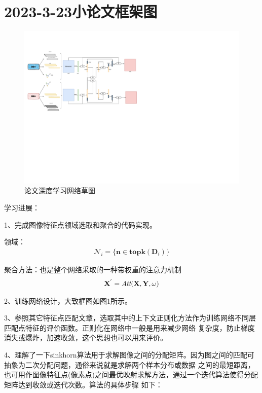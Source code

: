 \documentclass[10pt,a4paper]{article}
\begin{document}
\tableofcontents %
\newpage

\section{2023-3-23\quad 小论文框架图}

\begin{figure}[!htb]
\includegraphics[width=\hsize]{images/论文框图.pdf}
\caption{论文深度学习网络草图}
\end{figure}

学习进展：

1、完成图像特征点领域选取和聚合的代码实现。

领域：
\begin{align}
   \mathcal{N}_i=\{\mathbf{n}\in \mathbf{topk}(\mathbf{D}_i)\}
\end{align}

聚合方法：也是整个网络采取的一种带权重的注意力机制
\begin{align}
   \mathbf{X}^{'}=\mathbf{\emph{Att}}(\mathbf{X},\mathbf{Y},\mathbf{\omega}) 
\end{align}

2、训练网络设计，大致框图如图1所示。

3、参照其它特征点匹配文章，选取其中的上下文正则化方法作为训练网络不同层匹配点特征的评价函数。正则化在网络中一般是用来减少网络
复杂度，防止梯度消失或爆炸，加速收敛，这个思想也可以用来评价。

4、理解了一下sinkhorn算法用于求解图像之间的分配矩阵。因为图之间的匹配可抽象为二次分配问题，通俗来说就是求解两个样本分布或数据
之间的最短距离，也可用作图像特征点(像素点)之间最优映射求解方法，通过一个迭代算法使得分配矩阵达到收敛或迭代次数。算法的具体步骤
如下：
\end{document}
